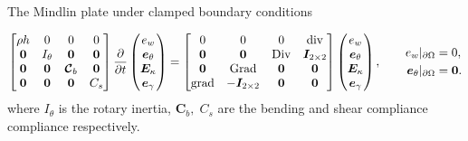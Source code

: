 \documentclass[aspectratio=169]{ISAE-Beamer}
\DeclareMathOperator*{\grad}{grad}
\DeclareMathOperator*{\Grad}{Grad}
\DeclareMathOperator*{\Div}{Div}
\renewcommand{\div}{\operatorname{div}}
\begin{document}
\begin{frame}{The Mindlin plate under clamped boundary conditions}

\begin{equation*}
	\begin{bmatrix}
	\rho h  & 0  & 0  & 0 \\
	\bm{0} & I_\theta &  \bm{0} & \bm{0}\\
	\bm{0}  & \bm{0}  & \bm{\mathcal{C}}_b  & \bm{0}\\
	\bm{0} & \bm{0} &  \bm{0} & C_s \\
	\end{bmatrix}
	\diffp{}{t}
	\begin{pmatrix}
	e_w \\
	\bm{e}_\theta \\
	\bm{E}_\kappa \\
	\bm{e}_{\gamma} \\
	\end{pmatrix} = 
	\begin{bmatrix}
	0  & 0  & 0  & \div \\
	\bm{0} & \bm{0} &  \Div & \bm{I}_{2 \times 2}\\
	\bm{0}  & \Grad  & \bm{0}  & \bm{0}\\
	\grad & -\bm{I}_{2 \times 2} &  \bm{0} & \bm{0} \\
	\end{bmatrix}
	\begin{pmatrix}
	e_w \\
	\bm{e}_{\theta} \\
	\bm{E}_{\kappa} \\
	\bm{e}_{\gamma} \\
	\end{pmatrix}, \qquad
	\begin{aligned}
	{e}_w\vert_{\partial\Omega} &= 0, \\
	\bm{e}_\theta\vert_{\partial\Omega} &= \bm{0}.
	\end{aligned}	
\end{equation*}
where $I_\theta$ is the rotary inertia, $\bm{C}_b, \; C_s$ are the bending and shear compliance compliance respectively.


\end{frame}
\end{document}
